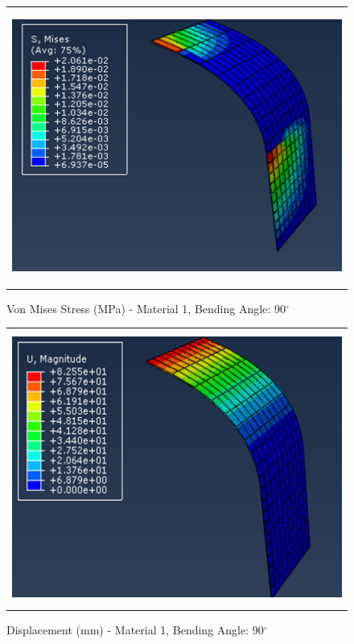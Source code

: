 \documentclass[a4paper,12pt]{article}
\numberwithin{equation}{section}
\numberwithin{figure}{section}
\begin{document}
\begin{figure}[H]
  \centering
  \begin{tabular}{@{}c@{}}
    \includegraphics[width=0.7\linewidth,height=255pt]{Results/Bending/M1_VMS_90.png} \\
  \end{tabular}
  \caption{Von Mises Stress (MPa) - Material 1,  Bending Angle: 90$^{\circ}$ }
\end{figure}

\begin{figure}[H]
  \centering
  \begin{tabular}{@{}c@{}}
    \includegraphics[width=0.7\linewidth,height=255pt]{Results/Bending/M1_DIS_90.png} \\
  \end{tabular}
  \caption{Displacement (mm) - Material 1, Bending Angle: 90$^{\circ}$ }
\end{figure}
\end{document}

